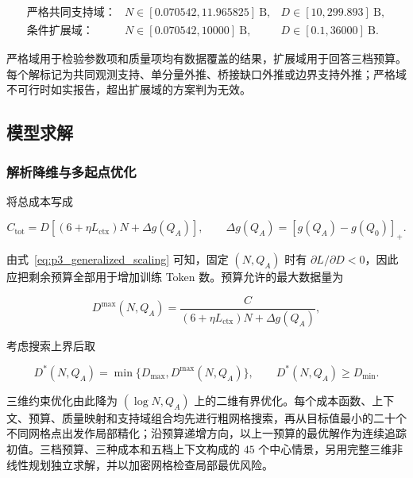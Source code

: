 \begin{equation}
\begin{array}{lll}
\text{严格共同支持域：}&N\in[0.070542,11.965825]\ \mathrm{B},
&D\in[10,299.893]\ \mathrm{B},\\
\text{条件扩展域：}&N\in[0.070542,10000]\ \mathrm{B},
&D\in[0.1,36000]\ \mathrm{B}.
\end{array}
\label{eq:p3_support_domains}
\end{equation}

严格域用于检验参数项和质量项均有数据覆盖的结果，扩展域用于回答三档预算。每个解标记为共同观测支持、单分量外推、桥接缺口外推或边界支持外推；严格域不可行时如实报告，超出扩展域的方案判为无效。

\subsection{模型求解}

\subsubsection{解析降维与多起点优化}

将总成本写成

\begin{equation}
C_{\mathrm{tot}}
=D\left[(6+\eta L_{\mathrm{ctx}})N
+\Delta g(Q_A)\right],
\qquad
\Delta g(Q_A)=[g(Q_A)-g(Q_0)]_+.
\label{eq:p3_cost_rearranged}
\end{equation}

由式~\eqref{eq:p3_generalized_scaling} 可知，固定 $(N,Q_A)$ 时有 $\partial L/\partial D<0$，因此应把剩余预算全部用于增加训练 Token 数。预算允许的最大数据量为

\begin{equation}
D^{\max}(N,Q_A)
=\frac{C}{(6+\eta L_{\mathrm{ctx}})N+\Delta g(Q_A)},
\label{eq:p3_dmax}
\end{equation}

考虑搜索上界后取

\begin{equation}
D^*(N,Q_A)
=\min\{D_{\max},D^{\max}(N,Q_A)\},
\qquad D^*(N,Q_A)\ge D_{\min}.
\label{eq:p3_dstar}
\end{equation}

三维约束优化由此降为 $(\log N,Q_A)$ 上的二维有界优化。每个成本函数、上下文、预算、质量映射和支持域组合均先进行粗网格搜索，再从目标值最小的二十个不同网格点出发作局部精化；沿预算递增方向，以上一预算的最优解作为连续追踪初值。三档预算、三种成本和五档上下文构成的 $45$ 个中心情景，另用完整三维非线性规划独立求解，并以加密网格检查局部最优风险。

